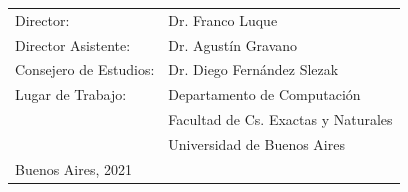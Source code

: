{\large

\begin{tabular}{l l}
    \vspace{.3cm} Director:               & Dr. Franco Luque \\
    \vspace{.3cm} Director Asistente:     & Dr. Agustín Gravano \\
    \vspace{.3cm} Consejero de Estudios:  & Dr. Diego Fernández Slezak \\
    Lugar de Trabajo:          & Departamento de Computación \\
                               & Facultad de Cs. Exactas y Naturales \\
    \vspace{1cm}               & Universidad de Buenos Aires \\
    Buenos Aires, 2021         & \\
\end{tabular}

\vspace{.2cm}



\vspace{.2cm}


}

\newpage\thispagestyle{empty}
